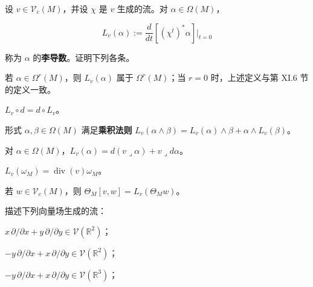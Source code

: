 \begin{exercises}
\item

设 $ v \in \mathcal{V}_c(M) $，并设 $ \chi $ 是 $ v $ 生成的流。对 $ \alpha \in \Omega(M) $，

\[
L_v(\alpha) := \frac{d}{dt}\left[(\chi^t)^*\alpha\right]\big|_{t=0}
\]

称为 $ \alpha $ 的\textbf{李导数}。证明下列各条。

\begin{subitems}
\item

若 $ \alpha \in \Omega^r(M) $，则 $ L_v(\alpha) $ 属于 $ \Omega^r(M) $；当 $ r = 0 $ 时，上述定义与第 XI.6 节的定义一致。

\item

$ L_v \circ d = d \circ L_v $。

\item

形式 $ \alpha, \beta \in \Omega(M) $ 满足\textbf{乘积法则} $ L_v(\alpha \wedge \beta) = L_v(\alpha) \wedge \beta + \alpha \wedge L_v(\beta) $。

\item

对 $ \alpha \in \Omega(M) $，$ L_v(\alpha) = d(v \lrcorner \alpha) + v \lrcorner d\alpha $。

\item

$ L_v(\omega_M) = \operatorname{div}(v)\omega_M $。

\item

若 $ w \in \mathcal{V}_c(M) $，则 $ \Theta_M[v, w] = L_v(\Theta_M w) $。

\end{subitems}

\item

描述下列向量场生成的流：

\begin{subitems}
\item

$ x\,\partial/\partial x + y\,\partial/\partial y \in \mathcal{V}(\mathbb{R}^2) $；

\item

$ -y\,\partial/\partial x + x\,\partial/\partial y \in \mathcal{V}(\mathbb{R}^2) $；

\item

$ -y\,\partial/\partial x + x\,\partial/\partial y \in \mathcal{V}(\mathbb{R}^3) $；


\end{subitems}
\end{exercises}
